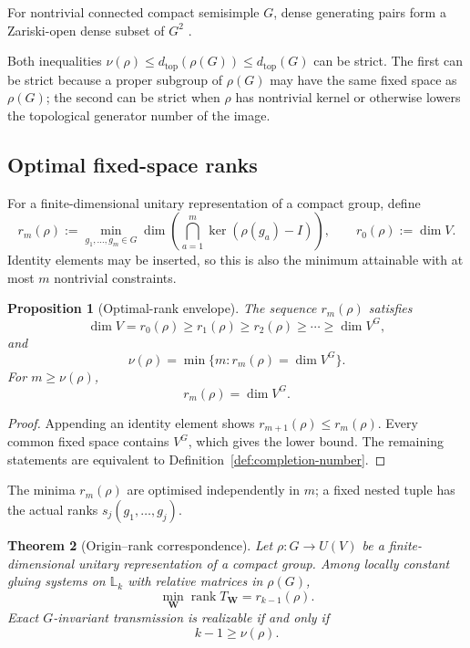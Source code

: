 \documentclass[11pt]{article}
\theoremstyle{plain}
\newtheorem{theorem}{Theorem}[section]
\newtheorem{proposition}[theorem]{Proposition}
\theoremstyle{definition}
\begin{document}
For nontrivial connected compact semisimple \(G\), dense generating pairs
form a Zariski-open dense subset of \(G^2\)
\citep{Chirvasitu2021GeneratingTuples}.

Both inequalities \(\nu(\rho) \leq d_{\mathrm{top}}(\rho(G)) \leq d_{\mathrm{top}}(G)\) can be strict. The first can be strict because a proper subgroup of
\(\rho(G)\) may have the same fixed space as \(\rho(G)\); the second can be
strict when \(\rho\) has nontrivial kernel or otherwise lowers the
topological generator number of the image.

\subsection{Optimal fixed-space ranks}

For a finite-dimensional unitary representation of a compact group, define
\begin{equation}
\label{eq:optimal-rank}
r_m(\rho)
:=
\min_{g_1,\ldots,g_m\in G}
\dim
\left(
\bigcap_{a=1}^{m}\ker(\rho(g_a)-I)
\right),
\qquad
r_0(\rho):=\dim V.
\end{equation}
Identity elements may be inserted, so this is also the minimum attainable with at most \(m\) nontrivial constraints.

\begin{proposition}[Optimal-rank envelope]
\label{prop:rank-profile-properties}
The sequence \(r_m(\rho)\) satisfies
\[
\dim V=r_0(\rho)
\geq r_1(\rho)
\geq r_2(\rho)
\geq\cdots
\geq\dim V^G,
\]
and
\[
\nu(\rho)
=
\min\{m:r_m(\rho)=\dim V^G\}.
\]
For \(m\geq\nu(\rho)\),
\[
r_m(\rho)=\dim V^G.
\]
\end{proposition}

\begin{proof}
Appending an identity element shows
\(r_{m+1}(\rho)\leq r_m(\rho)\).
Every common fixed space contains \(V^G\), which gives the lower bound. The remaining statements are equivalent to Definition~\ref{def:completion-number}.
\end{proof}

The minima \(r_m(\rho)\) are optimised independently in \(m\); a fixed nested tuple has the actual ranks \(s_j(g_1,\ldots,g_j)\).

\begin{theorem}[Origin--rank correspondence]
\label{thm:origin-rank-correspondence}
Let \(\rho:G\to U(V)\) be a finite-dimensional unitary representation of a compact group. Among locally constant gluing systems on \(\mathbb L_k\) with relative matrices in \(\rho(G)\),
\[
\min_{\mathbf W}\operatorname{rank}T_{\mathbf W}
=
r_{k-1}(\rho).
\]
Exact \(G\)-invariant transmission is realizable if and only if
\[
k-1\geq\nu(\rho).
\]
\end{theorem}
\end{document}
